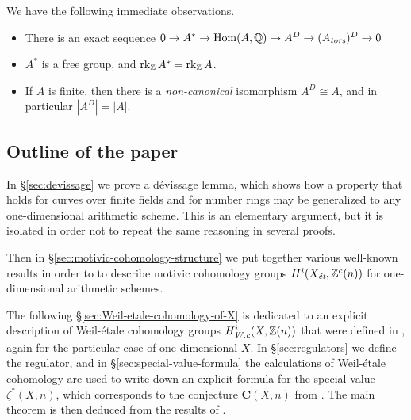 \documentclass[draft]{article}
\numberwithin{equation}{section}
\begin{document}
\begin{remark}
  \label{rmk:A-D-and-A-star}
  We have the following immediate observations.
  \begin{itemize}
  \item There is an exact sequence
    $0 \to A^* \to \Hom (A,\QQ) \to A^D \to (A_\tors)^D \to 0$

  \item $A^*$ is a free group, and $\rk_\ZZ A^* = \rk_\ZZ A$.

  \item If $A$ is finite, then there is a \emph{non-canonical} isomorphism
    $A^D \cong A$, and in particular $|A^D| = |A|$.
  \end{itemize}
\end{remark}



\subsection*{Outline of the paper}

In \S\ref{sec:devissage} we prove a d\'{e}vissage lemma, which shows how a property
that holds for curves over finite fields and for number rings may be generalized
to any one-dimensional arithmetic scheme. This is an elementary argument, but it
is isolated in order not to repeat the same reasoning in several proofs.

Then in \S\ref{sec:motivic-cohomology-structure} we put together various
well-known results in order to to describe motivic cohomology groups
$H^i (X_\et, \ZZ^c(n))$ for one-dimensional arithmetic schemes.

The following \S\ref{sec:Weil-etale-cohomology-of-X} is dedicated to an explicit
description of Weil-\'{e}tale cohomology groups $H^i_\Wc (X, \ZZ(n))$ that were
defined in \cite{Beshenov-Weil-etale-1}, again for the particular case of
one-dimensional $X$. In \S\ref{sec:regulators} we define the regulator, and in
\S\ref{sec:special-value-formula} the calculations of Weil-\'{e}tale cohomology are
used to write down an explicit formula for the special value $\zeta^* (X,n)$,
which corresponds to the conjecture $\mathbf{C} (X,n)$ from
\cite{Beshenov-Weil-etale-2}. The main theorem is then deduced from the results
of \cite{Beshenov-Weil-etale-2}.
\end{document}

